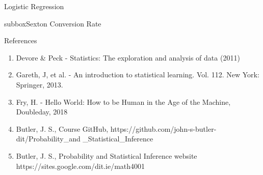 \documentclass[10pt,a4paper]{article}
\begin{document}
\begin{multicols}{3}
\begin{textbox}{Logistic Regression}
\begin{subbox}{subbox}{Sexton Conversion Rate}
\end{subbox}
\end{textbox}
\begin{textbox}{References}
\begin{enumerate}
\item 
Devore \& Peck  - Statistics: The exploration and analysis of data (2011)
\item
Gareth, J, et al. - An introduction to statistical learning. Vol. 112. New York: Springer, 2013.
\item
Fry, H. - Hello World: How to be Human in the Age of the Machine, Doubleday, 2018
\item Butler, J. S., Course GitHub, https://github.com/john-s-butler-dit/Probability\_and
\_Statistical\_Inference
\item Butler, J. S., Probability and Statistical Inference website https://sites.google.com/dit.ie/math4001

\end{enumerate}


\end{textbox}

\end{multicols}
\end{document}
